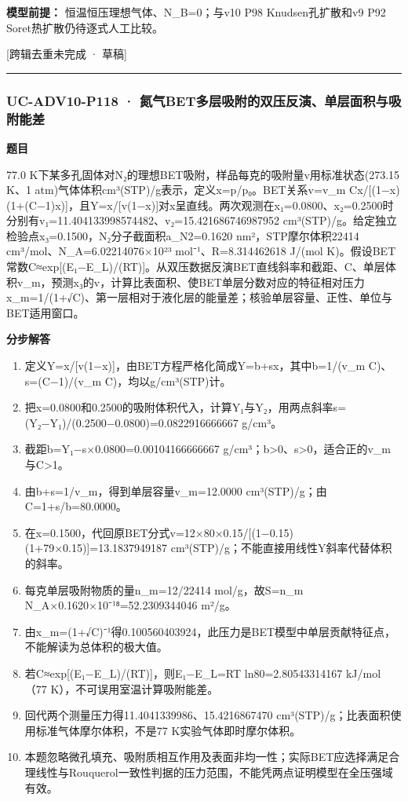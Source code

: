 \documentclass[UTF8,11pt,a4paper]{ctexart}
\begin{document}
\noindent\textbf{模型前提：}
恒温恒压理想气体、N\_B=0；与v10 P98 Knudsen孔扩散和v9 P92 Soret热扩散仍待逐式人工比较。\par
\noindent\textcolor{red!65!black}{[跨辑去重未完成 · 草稿]} \par
\medskip\hrule\medskip
{}
\subsubsection*{UC-ADV10-P118 · 氮气BET多层吸附的双压反演、单层面积与吸附能差}
\noindent\textbf{题目}\par
77.0 K下某多孔固体对N₂的理想BET吸附，样品每克的吸附量v用标准状态(273.15 K、1 atm)气体体积cm³(STP)/g表示，定义x=p/p₀。BET关系v=v\_m Cx/[(1−x)(1+(C−1)x)]，且Y=x/[v(1−x)]对x呈直线。两次观测在x₁=0.0800、x₂=0.2500时分别有v₁=11.404133998574482、v₂=15.421686746987952 cm³(STP)/g。给定独立检验点x₃=0.1500，N₂分子截面积a\_N2=0.1620 nm²，STP摩尔体积22414 cm³/mol、N\_A=6.02214076×10²³ mol⁻¹、R=8.314462618 J/(mol K)。假设BET常数C≈exp[(E₁−E\_L)/(RT)]。从双压数据反演BET直线斜率和截距、C、单层体积v\_m，预测x₃的v，计算比表面积、使BET单层分数对应的特征相对压力x\_m=1/(1+√C)、第一层相对于液化层的能量差；核验单层容量、正性、单位与BET适用窗口。\par
\medskip\noindent\textbf{分步解答}
\begin{enumerate}
\item 定义Y=x/[v(1−x)]，由BET方程严格化简成Y=b+sx，其中b=1/(v\_m C)、s=(C−1)/(v\_m C)，均以g/cm³(STP)计。
\item 把x=0.0800和0.2500的吸附体积代入，计算Y₁与Y₂，用两点斜率s=(Y₂−Y₁)/(0.2500−0.0800)=0.0822916666667 g/cm³。
\item 截距b=Y₁−s×0.0800=0.00104166666667 g/cm³；b>0、s>0，适合正的v\_m与C>1。
\item 由b+s=1/v\_m，得到单层容量v\_m=12.0000 cm³(STP)/g；由C=1+s/b=80.0000。
\item 在x=0.1500，代回原BET分式v=12×80×0.15/[(1−0.15)(1+79×0.15)]=13.1837949187 cm³(STP)/g；不能直接用线性Y斜率代替体积的斜率。
\item 每克单层吸附物质的量n\_m=12/22414 mol/g，故S=n\_m N\_A×0.1620×10⁻¹⁸=52.2309344046 m²/g。
\item 由x\_m=(1+√C)⁻¹得0.100560403924，此压力是BET模型中单层贡献特征点，不能解读为总体积的极大值。
\item 若C≈exp[(E₁−E\_L)/(RT)]，则E₁−E\_L=RT ln80=2.80543314167 kJ/mol（77 K），不可误用室温计算吸附能差。
\item 回代两个测量压力得11.4041339986、15.4216867470 cm³(STP)/g；比表面积使用标准气体摩尔体积，不是77 K实验气体即时摩尔体积。
\item 本题忽略微孔填充、吸附质相互作用及表面非均一性；实际BET应选择满足合理线性与Rouquerol一致性判据的压力范围，不能凭两点证明模型在全压强域有效。
\end{enumerate}
\end{document}
